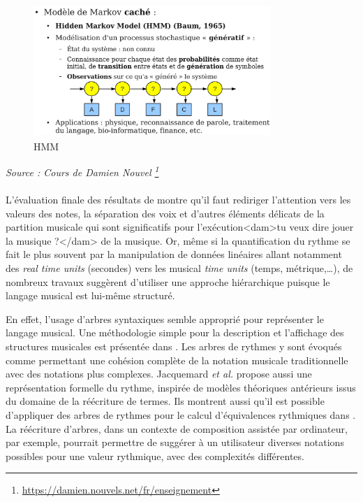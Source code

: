 \begin{figure}[h]
	\centering
	\includegraphics[height=50mm, width=90mm]{
    z_images/2_etat_de_l_art/0_hmm.png}
	\caption{HMM}
\end{figure}
\textit{Source : Cours de Damien Nouvel
\footnote{\url{https://damien.nouvels.net/fr/enseignement}}}\\\\

L’évaluation finale des résultats de \cite{SHIBATA2021262} montre qu’il faut
rediriger l’attention vers les valeurs des notes, la séparation des voix et
d'autres éléments délicats de la partition musicale qui sont significatifs pour
l'exécution<dam>tu veux dire jouer la musique ?</dam> de la musique. 
Or, même si la quantification du rythme se fait le plus souvent par la
manipulation de données linéaires allant notamment des \textit{real time units}
(secondes) vers les musical \textit{time units} (temps, métrique,…), de
nombreux travaux suggèrent d’utiliser une approche hiérarchique puisque le
langage musical est lui-même structuré.


En effet, l’usage d’arbres syntaxiques semble approprié pour représenter le
langage musical. Une méthodologie simple pour la description et l'affichage des
structures musicales est présentée dans \cite{rythm_tree}. 
Les arbres de rythmes y sont évoqués comme permettant une cohésion complète de
la notation musicale traditionnelle avec des notations plus complexes.
Jacquemard \textit{et al.} \cite{jacquemard:hal-01134096} propose aussi une
représentation formelle du rythme, inspirée de modèles théoriques antérieurs
issus du domaine de la réécriture de termes. 
 Ils montrent aussi qu'il est possible d'appliquer des arbres de
rythmes pour le calcul d'équivalences rythmiques dans
\cite{jacquemard:hal-01403982}. La réécriture d’arbres, dans un contexte de
composition assistée par ordinateur, par exemple, pourrait permettre de
suggérer à un utilisateur diverses notations possibles pour une valeur
rythmique, avec des complexités différentes.

